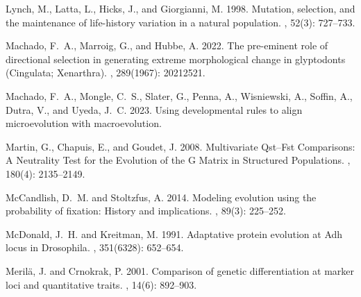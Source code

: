 \documentclass{article}
\begin{document}
\begin{thebibliography}{}
    Lynch, M., Latta, L., Hicks, J., and Giorgianni, M. 1998.
    \newblock Mutation, selection, and the maintenance of life-history variation in
    a natural population.
    , {52}(3): 727--733.

    Machado, F.~A., Marroig, G., and Hubbe, A. 2022.
    \newblock The pre-eminent role of directional selection in generating extreme
    morphological change in glyptodonts ({{Cingulata}}; {{Xenarthra}}).
    ,
        {289}(1967): 20212521.

    Machado, F.~A., Mongle, C.~S., Slater, G., Penna, A., Wisniewski, A., Soffin,
    A., Dutra, V., and Uyeda, J.~C. 2023.
    \newblock Using developmental rules to align microevolution with
    macroevolution.

    Martin, G., Chapuis, E., and Goudet, J. 2008.
    \newblock Multivariate {{Qst}}--{{Fst Comparisons}}: {{A Neutrality Test}} for
    the {{Evolution}} of the {{G Matrix}} in {{Structured Populations}}.
    , {180}(4): 2135--2149.

    McCandlish, D.~M. and Stoltzfus, A. 2014.
    \newblock Modeling evolution using the probability of fixation: {{History}} and
    implications.
    , {89}(3): 225--252.

    McDonald, J.~H. and Kreitman, M. 1991.
    \newblock Adaptative protein evolution at {{Adh}} locus in {{Drosophila}}.
    , {351}(6328): 652--654.

    Meril{\"a}, J. and Crnokrak, P. 2001.
    \newblock Comparison of genetic differentiation at marker loci and quantitative
    traits.
    , {14}(6): 892--903.


\end{thebibliography}
\end{document}
